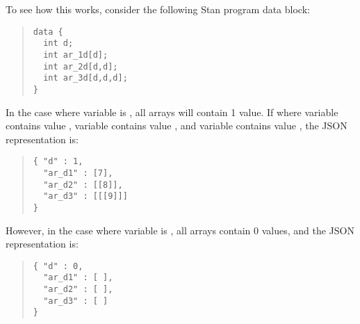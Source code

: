 To see how this works, consider the following Stan program data block:
\begin{quote}
\begin{Verbatim}
data {
  int d;
  int ar_1d[d];
  int ar_2d[d,d];
  int ar_3d[d,d,d];
}
\end{Verbatim}
\end{quote}
In the case where variable  is ,  all arrays will contain 1 value.
If where variable  contains value ,
variable  contains value , and
variable  contains value , 
the JSON representation is:
\begin{quote}
\begin{Verbatim}
{ "d" : 1,
  "ar_d1" : [7],
  "ar_d2" : [[8]],
  "ar_d3" : [[[9]]]
}
\end{Verbatim}
\end{quote}
However, in the case where variable   is ,
all arrays contain 0 values, and the JSON representation is:
\begin{quote}
\begin{Verbatim}
{ "d" : 0,
  "ar_d1" : [ ],
  "ar_d2" : [ ],
  "ar_d3" : [ ]
}
\end{Verbatim}
\end{quote}

%


